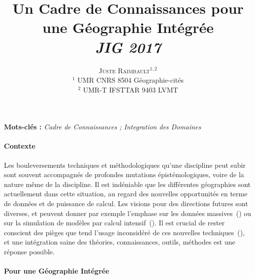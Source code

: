 \documentclass[11pt]{article}
\newcommand{\noun}[1]{\textsc{#1}}
\begin{document}
\title{%
Un Cadre de Connaissances pour une Géographie Intégrée
\bigskip\bigskip\\
\textit{JIG 2017}
}
\author{\noun{Juste Raimbault}$^{1,2}$\medskip\\%
$^1$ UMR CNRS 8504 Géographie-cités\\
$^2$ UMR-T IFSTTAR 9403 LVMT\\
}
\date{}

\maketitle

\justify



\textbf{Mots-clés : }\textit{Cadre de Connaissances ; Integration des Domaines}

\medskip


\paragraph{Contexte}

Les bouleversements techniques et méthodologiques qu'une discipline peut subir sont souvent accompagnés de profondes mutations épistémologiques, voire de la nature même de la discipline. Il est indéniable que les différentes géographies sont actuellement dans cette situation, au regard des nouvelles opportunités en terme de données et de puissance de calcul. Les visions pour des directions futures sont diverses, et peuvent donner par exemple l'emphase sur les données massives~(\cite{batty2012smart}) ou sur la simulation de modèles par calcul intensif~(\cite{pumain2017urban}). Il est crucial de rester conscient des pièges que tend l'usage inconsidéré de ces nouvelles techniques~(\cite{raimbault2016cautious}), et une intégration saine des théories, connaissances, outils, méthodes est une réponse possible. 


\paragraph{Pour une Géographie Intégrée}
\end{document}
